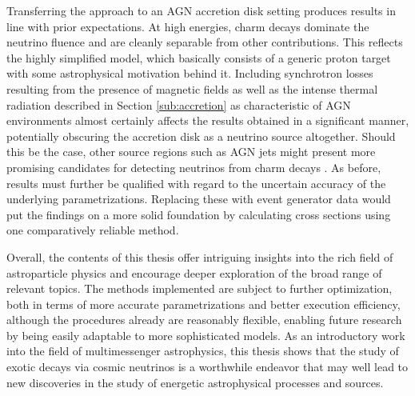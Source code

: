 \begin{spacing}{0.980}
	Transferring the approach to an AGN accretion disk setting produces results in line with prior expectations. At high energies,
	charm decays dominate the neutrino fluence and are cleanly separable from other contributions. This reflects the highly simplified
	model, which basically consists of a generic proton target with some astrophysical motivation behind it. Including synchrotron
	losses resulting from the presence of magnetic fields as well as the intense thermal radiation described in Section \ref{sub:accretion}
	as characteristic of AGN environments almost certainly affects the results obtained in a significant manner, potentially
	obscuring the accretion disk as a neutrino source altogether. Should this be the case, other source regions such as AGN jets
	might present more promising candidates for detecting neutrinos from charm decays \cite{Murase_2023}. As before, results must
	further be qualified with regard to the uncertain accuracy of the underlying parametrizations. Replacing these with event generator
	data would put the findings on a more solid foundation by calculating cross sections using one comparatively reliable method.
	\enlargethispage*{2\baselineskip}\newpage
\end{spacing}

Overall, the contents of this thesis offer intriguing insights into the rich field of astroparticle physics and encourage deeper
exploration of the broad range of relevant topics. The methods implemented are subject to further optimization, both in terms
of more accurate parametrizations and better execution efficiency, although the procedures already are reasonably flexible,
enabling future research by being easily adaptable to more sophisticated models. As an introductory work into the field of
multimessenger astrophysics, this thesis shows that the study of exotic decays via cosmic neutrinos is a worthwhile endeavor
that may well lead to new discoveries in the study of energetic astrophysical processes and sources.
